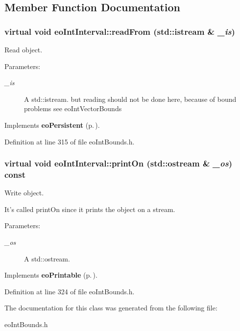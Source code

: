 \subsection{Member Function Documentation}
\subsubsection{\setlength{\rightskip}{0pt plus 5cm}virtual void eo\-Int\-Interval::read\-From (std::istream \& {\em \_\-is})\hspace{0.3cm}{\tt  [inline, virtual]}}\label{classeo_int_interval_a14}


Read object. 

\begin{Desc}
\item[Parameters:]
\begin{description}
\item[{\em \_\-is}]A std::istream. but reading should not be done here, because of bound problems see eo\-Int\-Vector\-Bounds \end{description}
\end{Desc}


Implements {\bf eo\-Persistent} {\rm (p.\,\pageref{classeo_persistent_a1})}.

Definition at line 315 of file eo\-Int\-Bounds.h.
\subsubsection{\setlength{\rightskip}{0pt plus 5cm}virtual void eo\-Int\-Interval::print\-On (std::ostream \& {\em \_\-os}) const\hspace{0.3cm}{\tt  [inline, virtual]}}\label{classeo_int_interval_a15}


Write object. 

It's called print\-On since it prints the object on a stream. \begin{Desc}
\item[Parameters:]
\begin{description}
\item[{\em \_\-os}]A std::ostream. \end{description}
\end{Desc}


Implements {\bf eo\-Printable} {\rm (p.\,\pageref{classeo_printable_a1})}.

Definition at line 324 of file eo\-Int\-Bounds.h.

The documentation for this class was generated from the following file:\begin{CompactItemize}
\item 
eo\-Int\-Bounds.h\end{CompactItemize}
